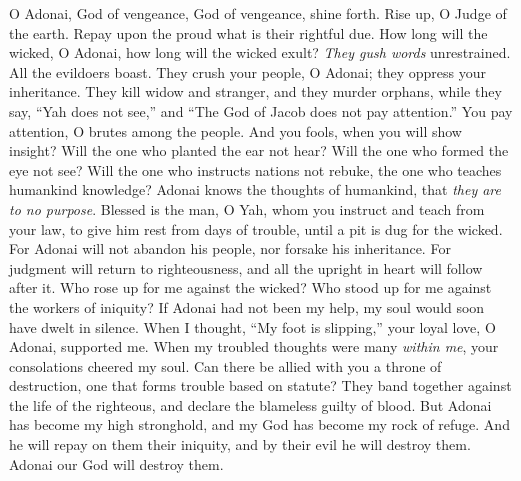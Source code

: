 \begin{biblechapter} %
 O Adonai, God of vengeance, 
God of vengeance, shine forth.
\verse Rise up, O Judge of the earth. 
Repay upon the proud what is their rightful due.
\verse How long will the wicked, O Adonai, 
how long will the wicked exult?
\verse \textit{They gush words} unrestrained. 
All the evildoers boast.
\verse They crush your people, O Adonai; 
they oppress your inheritance.
\verse They kill widow and stranger, 
and they murder orphans,
\verse while they say, “Yah does not see,” 
and “The God of Jacob does not pay attention.”
\verse You pay attention, O brutes among the people. 
And you fools, when you will show insight?
\verse Will the one who planted the ear not hear? 
Will the one who formed the eye not see?
\verse Will the one who instructs nations not rebuke, 
the one who teaches humankind knowledge?
\verse Adonai knows the thoughts of humankind, 
that \textit{they are to no purpose}.
\verse Blessed is the man, O Yah, whom you instruct 
and teach from your law,
\verse to give him rest from days of trouble, 
until a pit is dug for the wicked.
\verse For Adonai will not abandon his people, 
nor forsake his inheritance.
\verse For judgment will return to righteousness, 
and all the upright in heart will follow after it.
\verse Who rose up for me against the wicked? 
Who stood up for me against the workers of iniquity?
\verse If Adonai had not been my help, 
my soul would soon have dwelt in silence.
\verse When I thought, “My foot is slipping,” 
your loyal love, O Adonai, supported me.
\verse When my troubled thoughts were many \textit{within me}, 
your consolations cheered my soul.
\verse Can there be allied with you a throne of destruction, 
one that forms trouble based on statute?
\verse They band together against the life of the righteous, 
and declare the blameless guilty of blood.
\verse But Adonai has become my high stronghold, 
and my God has become my rock of refuge.
\verse And he will repay on them their iniquity, 
and by their evil he will destroy them. 
Adonai our God will destroy them.
\end{biblechapter}

